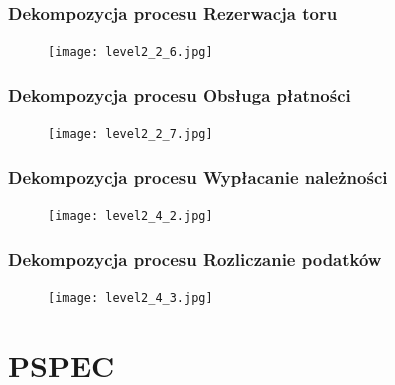 \documentclass[a4paper,11pt]{article}
\begin{document}
\subsubsection{Dekompozycja procesu Rezerwacja toru}
    \begin{figure}[!htb]
    \centerline{\texttt{[image: level2\_2\_6.jpg]}}
    \label{fig:level2_2_6}
    \end{figure}
    \newpage
    
\subsubsection{Dekompozycja procesu Obsługa płatności}
    \begin{figure}[!htb]
    \centerline{\texttt{[image: level2\_2\_7.jpg]}}
    \label{fig:level2_2_7}
    \end{figure}
    \newpage
    
\subsubsection{Dekompozycja procesu Wypłacanie należności}
    \begin{figure}[!htb]
    \centerline{\texttt{[image: level2\_4\_2.jpg]}}
    \label{fig:level2_4_2}
    \end{figure}
    \newpage
 
\subsubsection{Dekompozycja procesu Rozliczanie podatków}
    \begin{figure}[!htb]
    \centerline{\texttt{[image: level2\_4\_3.jpg]}}
    \label{fig:level2_4_3}
    \end{figure}
    \newpage
    

\section{PSPEC}
\end{document}
